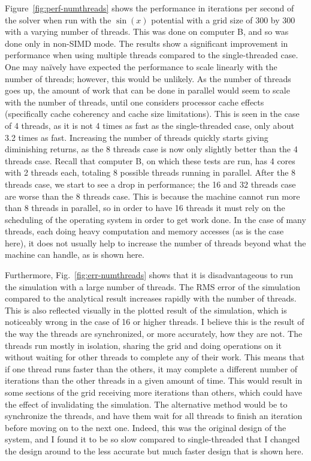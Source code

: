 Figure~\ref{fig:perf-numthreads} shows the performance in iterations per second of the solver when run
with the $\sin(x)$ potential with a grid size of 300 by 300 with a varying number of threads. This was done on computer B, and so was done
only in non-SIMD mode. The results show a significant improvement in performance when using multiple threads
compared to the single-threaded case. One may na\"{i}vely have expected the performance to scale linearly
with the number of threads; however, this would be unlikely. As the number of threads goes up, the amount
of work that can be done in parallel would seem to scale with the number of threads, until one considers processor cache effects (specifically
cache coherency and cache size limitations). This is seen in the case of 4 threads, as it is not 4 times as fast as
the single-threaded case, only about 3.2 times as fast. Increasing the number of threads quickly starts giving diminishing
returns, as the 8 threads case is now only slightly better than the 4 threads case. Recall that computer B, on which these
tests are run, has 4 cores with 2 threads each, totaling 8 possible threads running in parallel. After the 8 threads case,
we start to see a drop in performance; the 16 and 32 threads case are worse than the 8 threads case. This is because
the machine cannot run more than 8 threads in parallel, so in order to have 16 threads it must rely on the scheduling
of the operating system in order to get work done. In the case of many threads, each doing heavy computation and memory accesses
(as is the case here), it does not usually help to increase the number of threads beyond what the machine can handle,
as is shown here.



Furthermore, Fig.~\ref{fig:err-numthreads} shows that it is disadvantageous to run the simulation with
a large number of threads. The RMS error of the simulation compared to the analytical result increases
rapidly with the number of threads. This is also reflected visually in the plotted result of the simulation, which is
noticeably wrong in the case of 16 or higher threads. I believe this is the result of the way the threads
are synchronized, or more accurately, how they are not. The threads run mostly in isolation, sharing the
grid and doing operations on it without waiting for other threads to complete any of their work. This means
that if one thread runs faster than the others, it may complete a different number of iterations than the other
threads in a given amount of time. This would result in some sections of the grid receiving more iterations
than others, which could have the effect of invalidating the simulation. The alternative method would be
to synchronize the threads, and have them wait for all threads to finish an iteration before moving on
to the next one. Indeed, this was the original design of the system, and I found it to be so slow compared to
single-threaded that I changed the design around to the less accurate but much faster design that is shown here.



